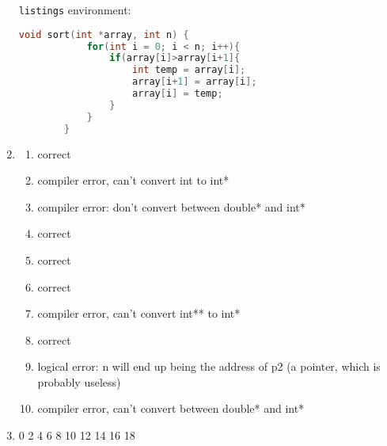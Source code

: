 \documentclass[11pt]{article}
\begin{document}
\begin{enumerate}[leftmargin=*]
    \verb|listings| environment:
    \begin{lstlisting}[language=C++]
        void sort(int *array, int n) {
            for(int i = 0; i < n; i++){
                if(array[i]>array[i+1]{
					int temp = array[i];
					array[i+1] = array[i];
					array[i] = temp;
				}
            }
        }
    \end{lstlisting}

    \item {\it }
    \begin{enumerate}
        \item
            correct

        \item
            compiler error, can't convert int to int*

        \item
            compiler error: don't convert between double* and int*

        \item
            correct

        \item
            correct

        \item
            correct

        \item
            compiler error, can't convert int** to int*

        \item
            correct

        \item
            logical error: n will end up being the address of p2 (a pointer, which is probably useless)

        \item
            compiler error, can't convert between double* and int*
    \end{enumerate}

    \item {\it }
    0 2 4 6 8 10 12 14 16 18

\end{enumerate}
\end{document}

